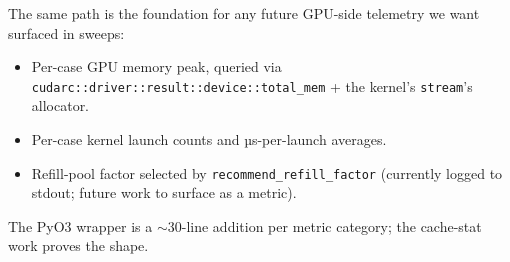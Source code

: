 The same path is the foundation for any future GPU-side
telemetry we want surfaced in sweeps:

\begin{itemize}
    \item Per-case GPU memory peak, queried via
        \texttt{cudarc::driver::result::device::total\_mem} +
        the kernel's \texttt{stream}'s allocator.
    \item Per-case kernel launch counts and µs-per-launch
        averages.
    \item Refill-pool factor selected by
        \texttt{recommend\_refill\_factor} (currently logged to
        stdout; future work to surface as a metric).
\end{itemize}

The PyO3 wrapper is a $\sim$30-line addition per metric category;
the cache-stat work proves the shape.
